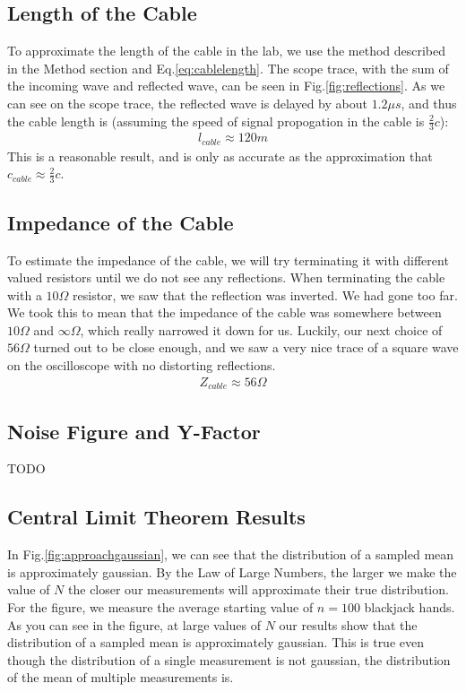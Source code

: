 \documentclass[12pt]{article}
\begin{document}
\subsection*{Length of the Cable}
To approximate the length of the cable in the lab, we use the method described in the Method section and Eq.\ref{eq:cablelength}. The scope trace, with the sum of the incoming wave and reflected wave, can be seen in Fig.\ref{fig:reflections}. As we can see on the scope trace, the reflected wave is delayed by about $1.2\mu s$, and thus the cable length is (assuming the speed of signal propogation in the cable is $\frac{2}{3}c$):
\begin{eqnarray}
l_{cable} \approx 120m \nonumber
\end{eqnarray}
This is a reasonable result, and is only as accurate as the approximation that $c_{cable} \approx \frac{2}{3}c$.

\subsection*{Impedance of the Cable}
To estimate the impedance of the cable, we will try terminating it with different valued resistors until we do not see any reflections. When terminating the cable with a $10\Omega$ resistor, we saw that the reflection was inverted. We had gone too far. We took this to mean that the impedance of the cable was somewhere between $10\Omega$ and $\infty\Omega$, which really narrowed it down for us. Luckily, our next choice of $56\Omega$ turned out to be close enough, and we saw a very nice trace of a square wave on the oscilloscope with no distorting reflections.
\begin{eqnarray}
Z_{cable} \approx 56\Omega \nonumber
\end{eqnarray}

\subsection*{Noise Figure and Y-Factor}
TODO

\subsection*{Central Limit Theorem Results}
In Fig.\ref{fig:approachgaussian}, we can see that the distribution of a sampled mean is approximately gaussian. By the Law of Large Numbers, the larger we make the value of $N$ the closer our measurements will approximate their true distribution. For the figure, we measure the average starting value of $n=100$ blackjack hands. As you can see in the figure, at large values of $N$ our results show that the distribution of a sampled mean is approximately gaussian. This is true even though the distribution of a single measurement is not gaussian, the distribution of the mean of multiple measurements is.
\end{document}
